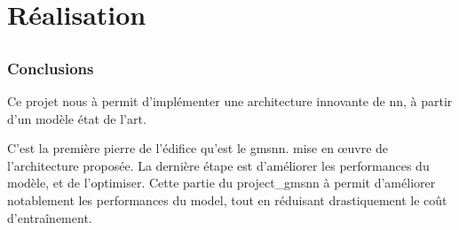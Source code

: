 \chapter{Réalisation}



\section{} %


\subsection{Conclusions}
Ce projet nous à permit d'implémenter une architecture innovante de \gls{nn}, à partir d'un modèle état de l'art.

C'est la première pierre de l'édifice qu'est le \gls{gmsnn}.
mise en œuvre de l'architecture proposée. La dernière étape est d'améliorer les performances du modèle, et de l'optimiser.
Cette partie du \gls{project_gmsnn} à permit d'améliorer notablement les performances du \gls{model}, tout en réduisant drastiquement le coût d'entraînement.

